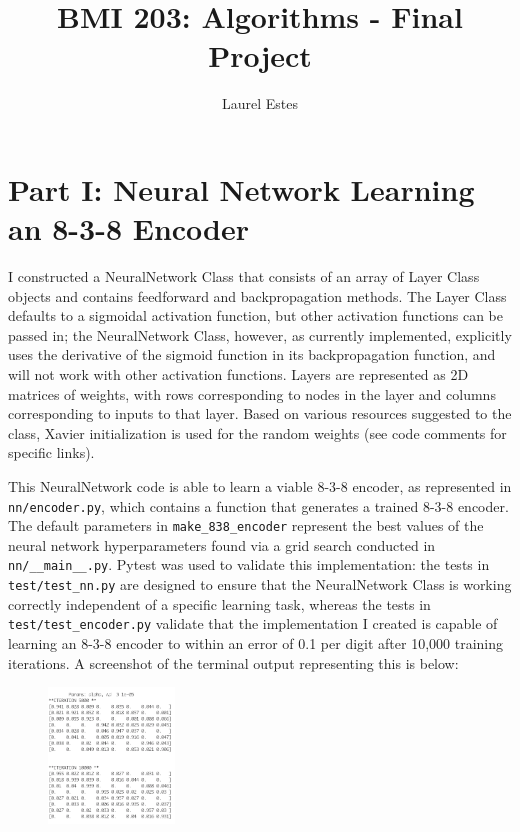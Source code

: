 \documentclass[12pt]{article}
\begin{document}
\title{BMI 203: Algorithms - Final Project}
\author{Laurel Estes}
\maketitle
\section*{Part I: Neural Network Learning an 8-3-8 Encoder}
I constructed a NeuralNetwork Class that consists of an array of Layer Class objects and contains feedforward and backpropagation methods. The Layer Class defaults to a sigmoidal activation function, but other activation functions can be passed in; the NeuralNetwork Class, however, as currently implemented, explicitly uses the derivative of the sigmoid function in its backpropagation function, and will not work with other activation functions. Layers are represented as 2D matrices of weights, with rows corresponding to nodes in the layer and columns corresponding to inputs to that layer. Based on various resources suggested to the class, Xavier initialization is used for the random weights (see code comments for specific links).
\par This NeuralNetwork code is able to learn a viable 8-3-8 encoder, as represented in \verb|nn/encoder.py|, which contains a function that generates a trained 8-3-8 encoder. The default parameters in \verb|make_838_encoder| represent the best values of the neural network hyperparameters found via a grid search conducted in \verb|nn/__main__.py|. Pytest was used to validate this implementation: the tests in \verb|test/test_nn.py| are designed to ensure that the NeuralNetwork Class is working correctly independent of a specific learning task, whereas the tests in \verb|test/test_encoder.py| validate that the implementation I created is capable of learning an 8-3-8 encoder to within an error of 0.1 per digit after 10,000 training iterations. A screenshot of the terminal output representing this is below:
\begin{figure}[h!]
\centering
\includegraphics[width=0.3\textwidth]{838_encoder.png}
\end{figure}
\end{document}
